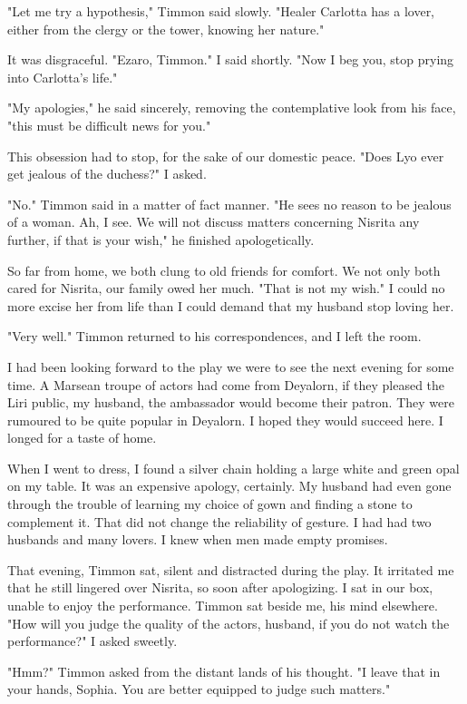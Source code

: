 \documentclass{article}
\begin{document}
"Let me try a hypothesis," Timmon said slowly. "Healer Carlotta has a lover, either from the clergy or the tower, knowing her nature."

It was disgraceful. "Ezaro, Timmon." I said shortly. "Now I beg you, stop prying into Carlotta's life."

"My apologies," he said sincerely, removing the contemplative look from his face, "this must be difficult news for you." 

This obsession had to stop, for the sake of our domestic peace. "Does Lyo ever get jealous of the duchess?" I asked.

"No." Timmon said in a matter of fact manner. "He sees no reason to be jealous of a woman. Ah, I see. We will not discuss matters concerning Nisrita any further, if that is your wish," he finished apologetically.

So far from home, we both clung to old friends for comfort. We not only both cared for Nisrita, our family owed her much. "That is not my wish." I could no more excise her from life than I could demand that my husband stop loving her. 

"Very well." Timmon returned to his correspondences, and I left the room.

I had been looking forward to the play we were to see the next evening for some time. A Marsean troupe of actors had come from Deyalorn, if they pleased the Liri public, my husband, the ambassador would become their patron. They were rumoured to be quite popular in Deyalorn. I hoped they would succeed here. I longed for a taste of home. 

When I went to dress, I found a silver chain holding a large white and green opal on my table. It was an expensive apology, certainly. My husband had even gone through the trouble of learning my choice of gown and finding a stone to complement it. That did not change the reliability of gesture. I had had two husbands and many lovers. I knew when men made empty promises.

That evening, Timmon sat, silent and distracted during the play. It irritated me that he still lingered over Nisrita, so soon after apologizing. I sat in our box, unable to enjoy the performance. Timmon sat beside me, his mind elsewhere. "How will you judge the quality of the actors, husband, if you do not watch the performance?" I asked sweetly.

"Hmm?" Timmon asked from the distant lands of his thought. "I leave that in your hands, Sophia. You are better equipped to judge such matters."
\end{document}
